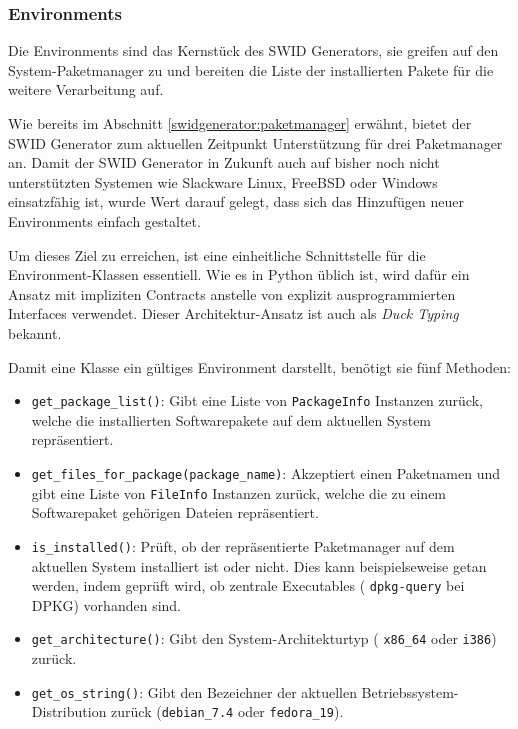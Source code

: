 \subsubsection{Environments}
\label{swidgenerator:architektur:environments}

Die Environments sind das Kernstück des SWID Generators, sie greifen auf
den System-Paketmanager zu und bereiten die Liste der installierten Pakete für
die weitere Verarbeitung auf.

Wie bereits im Abschnitt \ref{swidgenerator:paketmanager} erwähnt, bietet der
SWID Generator zum aktuellen Zeitpunkt Unterstützung für drei Paketmanager an.
Damit der SWID Generator in Zukunft auch auf bisher noch nicht unterstützten
Systemen wie Slackware Linux, FreeBSD oder Windows einsatzfähig ist, wurde Wert
darauf gelegt, dass sich das Hinzufügen neuer Environments einfach gestaltet.

Um dieses Ziel zu erreichen, ist eine einheitliche Schnittstelle für die
Environment-Klassen essentiell. Wie es in Python üblich ist, wird dafür ein
Ansatz mit impliziten Contracts anstelle von explizit ausprogrammierten
Interfaces verwendet\cite{contracts:2003}. Dieser Architektur-Ansatz ist auch
als \textit{Duck Typing} bekannt.

Damit eine Klasse ein gültiges Environment darstellt, benötigt sie 
fünf Methoden:

\begin{itemize}
	\item \texttt{get\_package\_list()}: Gibt eine Liste von
		\texttt{PackageInfo} Instanzen zurück,
		welche die installierten Softwarepakete auf dem aktuellen System
		repräsentiert.
	\item \texttt{get\_files\_for\_package(package\_name)}: Akzeptiert einen
		Paketnamen und gibt eine Liste von
		\texttt{FileInfo} Instanzen zurück, welche
		die zu einem Softwarepaket gehörigen Dateien repräsentiert.
	\item \texttt{is\_installed()}: Prüft, ob der repräsentierte Paketmanager auf
		dem aktuellen System installiert ist oder nicht. Dies kann beispielseweise
		getan werden, indem geprüft wird, ob zentrale Executables (\zb
		\texttt{dpkg-query} bei DPKG) vorhanden sind.
	\item \texttt{get\_architecture()}: Gibt den System-Architekturtyp (\zb
		\texttt{x86\_64} oder \texttt{i386}) zurück.
	\item \texttt{get\_os\_string()}: Gibt den Bezeichner der aktuellen
		Betriebssystem-Distribution zurück (\zb \texttt{debian\_7.4} oder
		\texttt{fedora\_19}).
\end{itemize}

